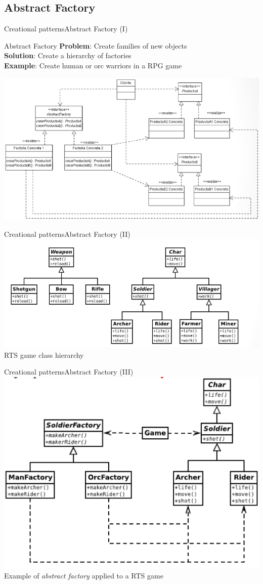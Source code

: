 \documentclass[10pt,compress]{beamer} %
\begin{document}
\subsection[Abstract Factory]{Abstract Factory}
\begin{frame}[plain]{Creational patterns}{Abstract Factory (I)}
	   \begin{block}{Abstract Factory}
			\textbf{Problem}: Create families of new objects\\
			\textbf{Solution}: Create a hierarchy of factories\\
			\textbf{Example}: Create human or orc warriors in a RPG game\\
		\end{block}
		\centering\includegraphics[width=0.8\linewidth]{figs/abstractfactory}\\
\end{frame}

\begin{frame}{Creational patterns}{Abstract Factory (II)}
	\centering\includegraphics[width=0.8\linewidth]{figs/jerarquiajuego}\\
	\centering RTS game class hierarchy
\end{frame}

\begin{frame}{Creational patterns}{Abstract Factory (III)}
	\centering\includegraphics[width=0.7\linewidth]{figs/abstractfactorygame}\\
	\centering Example of \textit{abstract factory} applied to a RTS game
\end{frame}
\end{document}
